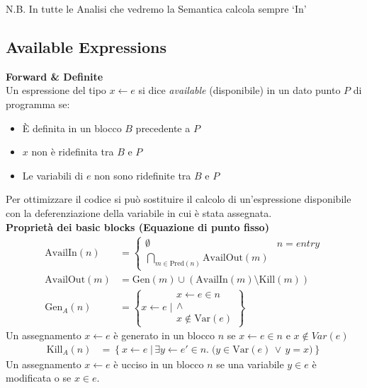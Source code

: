 \documentclass[a4paper,12pt,openany]{article}
\begin{document}
N.B. In tutte le Analisi che vedremo la Semantica calcola sempre `In'

\subsection{Available Expressions}
\textbf{Forward \& Definite}\\[1em]
Un espressione del tipo $x\leftarrow e$ si dice \emph{available} (disponibile) in un dato punto $P$ di programma se:
\begin{itemize}[noitemsep, topsep=0.3em]
    \item È definita in un blocco $B$ precedente a $P$
    \item $x$ non è ridefinita tra $B$ e $P$
    \item Le variabili di $e$ non sono ridefinite tra $B$ e $P$
\end{itemize}
Per ottimizzare il codice si può sostituire il calcolo di un'espressione disponibile con la deferenziazione della variabile in cui è stata assegnata.\\[1em]

\noindent\textbf{Proprietà dei basic blocks (Equazione di punto fisso)}
\begin{align*}
    \mbox{AvailIn}(n) &=
    \begin{cases}
        \emptyset & n = entry\\
        \bigcap\limits_{m\in \mbox{Pred}(n)} \mbox{AvailOut}(m)
    \end{cases}\\
    \mbox{AvailOut}(m) &= \mbox{Gen}(m) \cup (\mbox{AvailIn}(m) \setminus \mbox{Kill}(m))\\
    \mbox{Gen}_A(n) &= \left\{
        x \leftarrow e \;\Bigg\vert
        \begin{array}{cc}
            x \leftarrow e \in n\\
            \land\\
            x \notin \mbox{Var}(e)
        \end{array}
    \right\}
\end{align*}
Un assegnamento $x \gets e$ è generato in un blocco $n$ se $x \gets e \in n$ e $x \notin Var(e)$
\begin{align*}
    \mbox{Kill}_A(n) &= \left\{
        x \leftarrow e \;\big\vert\, \exists y \leftarrow e' \in n.\; \big( y \in \mbox{Var}(e) \,\lor\, y=x \big)
    \right\}
\end{align*}
Un assegnamento $x \gets e$ è ucciso in un blocco $n$ se una variabile $y \in e$ è modificata o se $x \in e$.
\end{document}
